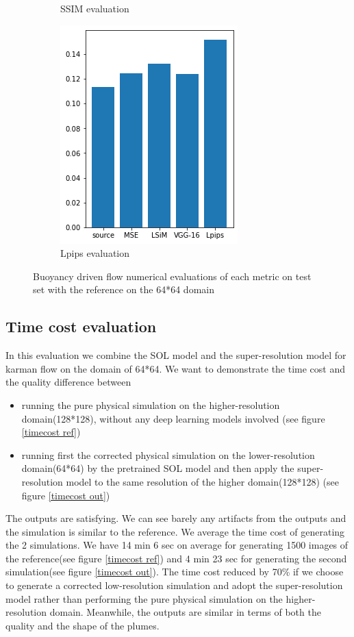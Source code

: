 \documentclass[a4paper,12pt,twoside]{report}
\begin{document}
\begin{figure}
\begin{subfigure}{0.32\textwidth}
			\caption{SSIM evaluation}
		\end{subfigure}
		\begin{subfigure}{0.32\textwidth}
			\centering
			\includegraphics[scale=0.49]{buoyancy_low/lpips_eval.png}
			\caption{Lpips evaluation}
		\end{subfigure}
		\caption{Buoyancy driven flow numerical evaluations of each metric on test set with the reference on the 64*64 domain}
		\label{sol buoyancy low numeval}
	\end{figure}

\subsection{Time cost evaluation}
In this evaluation we combine the SOL model and the super-resolution model for karman flow on the domain of 64*64. We want to demonstrate the time cost and the quality difference between
\begin{itemize}
	\item running  the pure physical simulation on the higher-resolution domain(128*128), without any deep learning models involved (see figure \ref{timecost ref})
	\item running first the corrected physical simulation on the lower-resolution domain(64*64) by the pretrained SOL model and then apply the super-resolution model to the same resolution of the higher domain(128*128) (see figure \ref{timecost out})
\end{itemize}
The outputs are satisfying. We can see barely any artifacts from the outputs and the simulation is similar to the reference. We average the time cost of generating the 2 simulations. We have 14 min 6 sec on average for generating 1500 images of the reference(see figure \ref{timecost ref}) and 4 min 23 sec for generating the second simulation(see figure \ref{timecost out}). The time cost reduced by 70\% if we choose to generate a corrected low-resolution simulation and adopt the super-resolution model rather than performing the pure physical simulation on the higher-resolution domain. Meanwhile, the outputs are similar in terms of both the quality and the shape of the plumes.  
\end{document}
